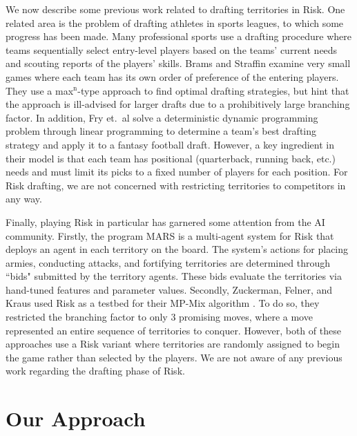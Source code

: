 \documentclass[letterpaper]{article}
\numberwithin{equation}{section}
\numberwithin{theorem}{section}
\numberwithin{lemma}{section}
\numberwithin{df}{section}
\begin{document}
We now describe some previous work related to drafting territories in Risk.  One related area is the problem of drafting athletes in sports leagues, to which some progress has been made.  Many professional sports use a drafting procedure where teams sequentially select entry-level players based on the teams' current needs and scouting reports of the players' skills.  Brams and Straffin \cite{PrisonAndDrafting} examine very small games where each team has its own order of preference of the entering players.  They use a max$^\text{n}$-type approach to find optimal drafting strategies, but hint that the approach is ill-advised for larger drafts due to a prohibitively large branching factor.  In addition, Fry et.~al \cite{SportsDrafting} solve a deterministic dynamic programming problem through linear programming to determine a team's best drafting strategy and apply it to a fantasy football draft.  However, a key ingredient in their model is that each team has positional (quarterback, running back, etc.) needs and must limit its picks to a fixed number of players for each position.  For Risk drafting, we are not concerned with restricting territories to competitors in any way.

Finally, playing Risk in particular has garnered some attention from the AI community.  Firstly, the program MARS \cite{RiskBots} is a multi-agent system for Risk that deploys an agent in each territory on the board.  The system's actions for placing armies, conducting attacks, and fortifying territories are determined through ``bids" submitted by the territory agents.  These bids evaluate the territories via hand-tuned features and parameter values.  Secondly, Zuckerman, Felner, and Kraus used Risk as a testbed for their MP-Mix algorithm \cite{ZuckFelnerKraus2009}.  To do so, they restricted the branching factor to only 3 promising moves, where a move represented an entire sequence of territories to conquer.  However, both of these approaches use a Risk variant where territories are randomly assigned to begin the game rather than selected by the players.  We are not aware of any previous work regarding the drafting phase of Risk.

\section{Our Approach}

\end{document}
